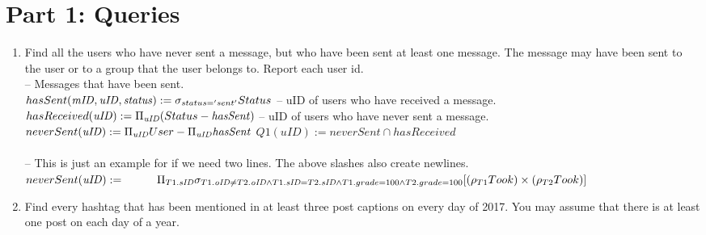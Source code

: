 \documentclass{article}
\newcommand{\var}[1]{\mathit{#1}}
\begin{document}
\section*{Part 1: Queries}

\begin{enumerate}

\item   %
Find all the users who have never sent a message, but who have been sent at least one message. The message may have been sent to the user or to a group that the user belongs to. Report each user id. \\

{\large %
--  Messages that have been sent. \\[5pt]
$
hasSent(\var{mID}, \var{uID}, \var{status}) :=  
	\sigma_{status = 'sent'} 
	Status \\[10pt]
$
-- uID of users who have received a message. \\[5pt]
$
hasReceived(\var{uID}) := 
	\Pi_{\var{uID}} 
	(Status - \var{hasSent}) 
	\\[10pt]
$
-- uID of users who have never sent a message. \\[5pt]
$
neverSent(\var{uID}) := 
	\Pi_{\var{uID}} User - \Pi_\var{uID}\var{hasSent} 
	\\[10pt]
$
$
Q1(\var{uID}) :=
	neverSent \cap hasReceived
$\\\\


-- This is just an example for if we need two lines. The above slashes also create newlines.\\
$
neverSent(\var{uID}) := \\[5pt]  %
	\hspace*{1cm}  %
	\Pi_{T1.\var{sID}} 
	\sigma_{
		T1.\var{oID} \neq T2.\var{oID} \wedge 
		T1.\var{sID} = T2.\var{sID} \wedge 
		T1.grade = 100 \wedge T2.grade = 100}
	[ (\rho_{T1}Took) \times (\rho_{T2}Took) ] \\[5pt]
$
} %


\item   %
Find every hashtag that has been mentioned in at least three post captions
on every day of 2017.
You may assume that there is at least one post on each day of a year. 


\end{enumerate}
\end{document}
